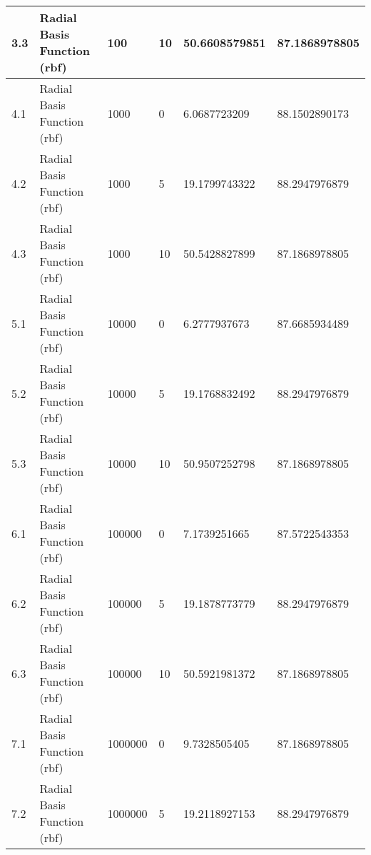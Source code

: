 \documentclass{report}
\begin{document}
\begin{table}[!h]
\begin{tabular}{|p{0.7cm}|p{4.1cm}|p{2.4cm}|p{2cm}|p{2.5cm}|p{2.5cm}|}
3.3            & Radial Basis Function (rbf) & 100                             & 10                                  & 50.6608579851                       & 87.1868978805              \\ \hline
4.1            & Radial Basis Function (rbf) & 1000                            & 0                                   & 6.0687723209                        & 88.1502890173              \\ \hline
4.2            & Radial Basis Function (rbf) & 1000                            & 5                                   & 19.1799743322                       & 88.2947976879              \\ \hline
4.3            & Radial Basis Function (rbf) & 1000                            & 10                                  & 50.5428827899                       & 87.1868978805              \\ \hline
5.1            & Radial Basis Function (rbf) & 10000                           & 0                                   & 6.2777937673                        & 87.6685934489              \\ \hline
5.2            & Radial Basis Function (rbf) & 10000                           & 5                                   & 19.1768832492                       & 88.2947976879              \\ \hline
5.3            & Radial Basis Function (rbf) & 10000                           & 10                                  & 50.9507252798                       & 87.1868978805              \\ \hline
6.1            & Radial Basis Function (rbf) & 100000                          & 0                                   & 7.1739251665                        & 87.5722543353              \\ \hline
6.2            & Radial Basis Function (rbf) & 100000                          & 5                                   & 19.1878773779                       & 88.2947976879              \\ \hline
6.3            & Radial Basis Function (rbf) & 100000                          & 10                                  & 50.5921981372                       & 87.1868978805              \\ \hline
7.1            & Radial Basis Function (rbf) & 1000000                         & 0                                   & 9.7328505405                        & 87.1868978805              \\ \hline
7.2            & Radial Basis Function (rbf) & 1000000                         & 5                                   & 19.2118927153                       & 88.2947976879              \\ \hline

\end{tabular}
\end{table}
\end{document}
